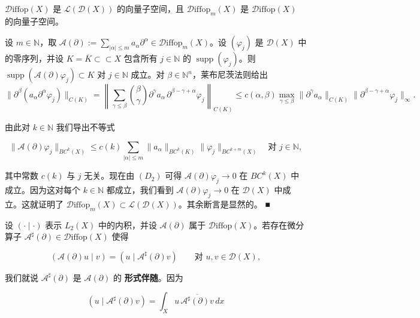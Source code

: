 \begin{proposition}

$ \mathcal{D}\mathrm{iffop}(X) $ 是 $ \mathcal{L}(\mathcal{D}(X)) $ 的向量子空间，且 $ \mathcal{D}\mathrm{iffop}_{m}(X) $ 是 $ \mathcal{D}\mathrm{iffop}(X) $ 的向量子空间。

\proofhead
设 $ m \in \mathbb{N} $，取 $ \mathcal{A}(\partial) := \sum_{|\alpha|\le m}a_{\alpha}\partial^{\alpha} \in \mathcal{D}\mathrm{iffop}_{m}(X) $。设 $ (\varphi_{j}) $ 是 $ \mathcal{D}(X) $ 中的零序列，并设 $ K = \overline{K} \subset\subset X $ 包含所有 $ j \in \mathbb{N} $ 的 $ \operatorname{supp}(\varphi_{j}) $。则 $ \operatorname{supp}(\mathcal{A}(\partial)\varphi_{j}) \subset K $ 对 $ j \in \mathbb{N} $ 成立。对 $ \beta \in \mathbb{N}^{n} $，莱布尼茨法则给出
\[
\|\partial^{\beta}(a_{\alpha}\partial^{\alpha}\varphi_{j})\|_{C(K)} = \left\|\sum_{\gamma\le\beta}\binom{\beta}{\gamma}\partial^{\gamma}a_{\alpha}\,\partial^{\beta-\gamma+\alpha}\varphi_{j}\right\|_{C(K)} \le c(\alpha,\beta)\max_{\gamma\le\beta}\|\partial^{\gamma}a_{\alpha}\|_{C(K)}\|\partial^{\beta-\gamma+\alpha}\varphi_{j}\|_{\infty} .
\]

由此对 $ k \in \mathbb{N} $ 我们导出不等式

\[
\|\mathcal{A}(\partial)\varphi_{j}\|_{BC^{k}(X)} \le c(k)\sum_{|\alpha|\le m}\|a_{\alpha}\|_{BC^{k}(K)}\|\varphi_{j}\|_{BC^{k+m}(X)} \quad \text{对 } j \in \mathbb{N} ,
\]

其中常数 $ c(k) $ 与 $ j $ 无关。现在由 $ (D_2) $ 可得 $ \mathcal{A}(\partial)\varphi_j \to 0 $ 在 $ BC^k(X) $ 中成立。因为这对每个 $ k \in \mathbb{N} $ 都成立，我们看到 $ \mathcal{A}(\partial)\varphi_j \to 0 $ 在 $ \mathcal{D}(X) $ 中成立。这就证明了 $ \mathcal{D}\mathrm{iffop}_m(X) \subset \mathcal{L}(\mathcal{D}(X)) $。其余断言是显然的。 \nobreak\hspace{0.35em}■

\end{proposition}

设 $ (\cdot \mid \cdot) $ 表示 $ L_2(X) $ 中的内积，并设 $ \mathcal{A}(\partial) $ 属于 $ \mathcal{D}\mathrm{iffop}(X) $。若存在微分算子 $ \mathcal{A}^{\sharp}(\partial) \in \mathcal{D}\mathrm{iffop}(X) $ 使得

\[
(\mathcal{A}(\partial)u \mid v) = (u \mid \mathcal{A}^{\sharp}(\partial)v) \qquad \text{对 } u, v \in \mathcal{D}(X) ,
\]

我们就说 $ \mathcal{A}^{\sharp}(\partial) $ 是 $ \mathcal{A}(\partial) $ 的 \textbf{形式伴随}。因为

\[
(u \mid \mathcal{A}^{\sharp}(\partial)v) = \int_X u\,\overline{\mathcal{A}^{\sharp}(\partial)v}\, dx
\]

